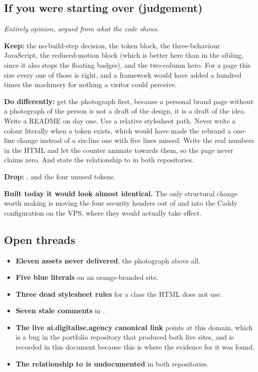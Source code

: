 \documentclass[11pt,a4paper]{article}
\begin{document}
\subsection{If you were starting over (judgement)}

\emph{Entirely opinion, argued from what the code shows.}

\textbf{Keep:} the no-build-step decision, the token block, the three-behaviour
JavaScript, the reduced-motion block (which is better here than in the sibling,
since it also stops the floating badges), and the two-column hero. For a page this
size every one of those is right, and a framework would have added a hundred times
the machinery for nothing a visitor could perceive.

\textbf{Do differently:} get the photograph first, because a personal brand page
without a photograph of the person is not a draft of the design, it is a draft of
the idea. Write a README on day one. Use a relative stylesheet path. Never write a
colour literally when a token exists, which would have made the rebrand a one-line
change instead of a six-line one with five lines missed. Write the real numbers in
the HTML and let the counter animate towards them, so the page never claims zero.
And state the relationship to  in both repositories.

\textbf{Drop:} , and the four unused tokens.

\textbf{Built today it would look almost identical.} The only structural change
worth making is moving the four security headers out of  and
into the Caddy configuration on the VPS, where they would actually take effect.

\subsection{Open threads}

\begin{itemize}
\item \textbf{Eleven assets never delivered}, the photograph above all.
\item \textbf{Five blue literals} on an orange-branded site.
\item \textbf{Three dead stylesheet rules} for a class the HTML does not use.
\item \textbf{Seven stale comments} in .
\item \textbf{The live ai.digitalise.agency canonical link} points at this domain,
  which is a bug in the portfolio repository that produced both live sites, and is
  recorded in this document because this is where the evidence for it was found.
\item \textbf{The relationship to  is undocumented} in both
  repositories.
\end{itemize}
\end{document}
